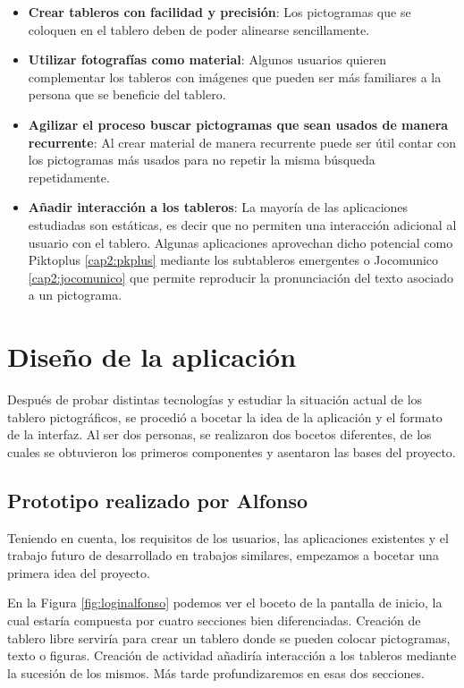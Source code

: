 \begin{itemize}
	\item \textbf{Crear tableros con facilidad y precisión}: Los pictogramas que se coloquen en el tablero deben de poder alinearse sencillamente. 
	\item \textbf{Utilizar fotografías como material}: Algunos usuarios quieren complementar los tableros con imágenes que pueden ser más familiares a la persona que se beneficie del tablero. 
	\item \textbf{Agilizar el proceso buscar pictogramas que sean usados de manera recurrente}: Al crear material de manera recurrente puede ser útil contar con los pictogramas más usados para no repetir la misma búsqueda repetidamente. 
	\item \textbf{Añadir interacción a los tableros}: La mayoría de las aplicaciones estudiadas son estáticas, es decir que no permiten una interacción adicional al usuario con el tablero. Algunas aplicaciones aprovechan dicho potencial como Piktoplus \ref{cap2:pkplus} mediante los subtableros emergentes o Jocomunico \ref{cap2:jocomunico} que permite reproducir la pronunciación del texto asociado a un pictograma.
	
\end{itemize}






\section{Diseño de la aplicación}

Después de probar distintas tecnologías y estudiar la situación actual de los tablero pictográficos, se procedió a bocetar la idea de la aplicación y el formato de la interfaz. Al ser dos personas, se realizaron dos bocetos diferentes, de los cuales se obtuvieron los primeros componentes y asentaron las bases del proyecto.


\subsection{Prototipo realizado por Alfonso}

Teniendo en cuenta, los requisitos de los usuarios, las aplicaciones existentes y el trabajo futuro de desarrollado en trabajos similares, empezamos a bocetar una primera idea del proyecto.


En la Figura \ref{fig:loginalfonso} podemos ver el boceto de la pantalla de  inicio, la cual estaría compuesta por cuatro secciones bien diferenciadas. Creación de tablero libre serviría para crear un tablero donde se pueden colocar pictogramas, texto o figuras. Creación de actividad añadiría interacción a los tableros mediante la sucesión de los mismos. Más tarde profundizaremos en esas dos secciones.

